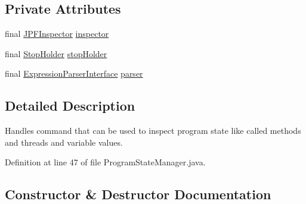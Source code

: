 \subsection*{Private Attributes}
\begin{DoxyCompactItemize}
\item 
final \hyperlink{classgov_1_1nasa_1_1jpf_1_1inspector_1_1server_1_1jpf_1_1_j_p_f_inspector}{J\+P\+F\+Inspector} \hyperlink{classgov_1_1nasa_1_1jpf_1_1inspector_1_1server_1_1programstate_1_1_program_state_manager_a7f6b466bef8fa70a70390311e477f942}{inspector}
\item 
final \hyperlink{classgov_1_1nasa_1_1jpf_1_1inspector_1_1server_1_1jpf_1_1_stop_holder}{Stop\+Holder} \hyperlink{classgov_1_1nasa_1_1jpf_1_1inspector_1_1server_1_1programstate_1_1_program_state_manager_a81892c2dbe16ef208fdd688bc0ff7c8f}{stop\+Holder}
\item 
final \hyperlink{interfacegov_1_1nasa_1_1jpf_1_1inspector_1_1server_1_1expression_1_1_expression_parser_interface}{Expression\+Parser\+Interface} \hyperlink{classgov_1_1nasa_1_1jpf_1_1inspector_1_1server_1_1programstate_1_1_program_state_manager_aa91893c70d6e52b2d7f835a1de5faad9}{parser}
\end{DoxyCompactItemize}


\subsection{Detailed Description}
Handles command that can be used to inspect program state like called methods and threads and variable values. 

Definition at line 47 of file Program\+State\+Manager.\+java.



\subsection{Constructor \& Destructor Documentation}
